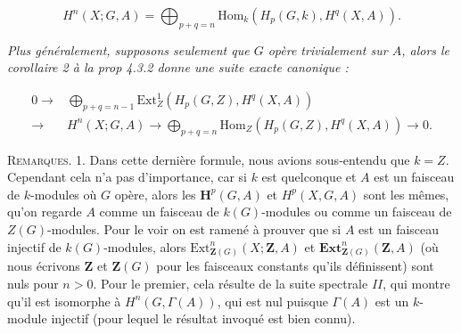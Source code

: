 \[
\tag{4.4.2}
H^n(X;G,A)=
\bigoplus_{p+q=n}
\mathrm{Hom}_k(H_p(G,k),H^q(X,A)).
\]

\textit{Plus généralement, supposons seulement que $G$ opère trivialement sur
$A$, alors le corollaire \textup{2} à la prop \textup{4.3.2} donne une suite exacte canonique :}

\[
\tag{4.4.3}
\begin{aligned}
0\to{}&
\bigoplus_{p+q=n-1}
\mathrm{Ext}_{Z}^1(H_p(G,Z),H^q(X,A))\\
\to{}&H^n(X;G,A)
\to
\bigoplus_{p+q=n}
\mathrm{Hom}_{Z}(H_p(G,Z),H^q(X,A))
\to0.
\end{aligned}
\]

\textsc{Remarques.} 1. Dans cette dernière formule, nous avions
sous-entendu que $k=Z$. Cependant cela n'a pas d'importance, car si
$k$ est quelconque et $A$ est un faisceau de $k$-modules où $G$ opère, alors
les $\mathbf H^p(G,A)$ et $H^p(X,G,A)$ sont les mêmes, qu'on regarde $A$ comme un
faisceau de $k(G)$-modules ou comme un faisceau de $Z(G)$-modules.
Pour le voir on est ramené à prouver que si $A$ est un faisceau injectif de
$k(G)$-modules, alors
$\mathrm{Ext}_{\mathbf Z(G)}^n(X;\mathbf Z,A)$ et
$\mathbf{Ext}_{\mathbf Z(G)}^n(\mathbf Z,A)$ (où nous écrivons $\mathbf Z$ et
$\mathbf Z(G)$ pour les faisceaux constants qu'ils définissent) sont nuls pour
$n>0$. Pour le premier, cela résulte de la suite spectrale $II$, qui montre
qu'il est isomorphe à $H^n(G,\Gamma(A))$, qui est nul puisque $\Gamma(A)$ est
un $k$-module injectif (pour lequel le résultat invoqué est bien connu).

